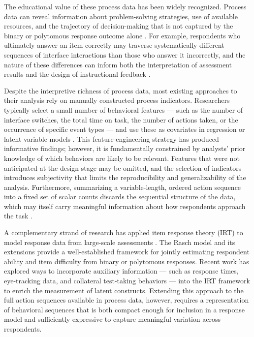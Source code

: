 \documentclass[A4paper,11pt]{article}
\begin{document}
The educational value of these process data has been widely recognized. Process data can reveal information about problem-solving strategies, use of available resources, and the trajectory of decision-making that is not captured by the binary or polytomous response outcome alone \citep{stadler2020first, eichmann2020exploring, he2021leveraging, reis2021improving, hahnel2023patterns}. For example, respondents who ultimately answer an item correctly may traverse systematically different sequences of interface interactions than those who answer it incorrectly, and the nature of these differences can inform both the interpretation of assessment results and the design of instructional feedback \citep{he2015identifying, he2016analyzing, tang2020latent, tang2021exploratory, xiao2021exploring, zhang2024external}.

Despite the interpretive richness of process data, most existing approaches to their analysis rely on manually constructed process indicators. Researchers typically select a small number of behavioral features --- such as the number of interface switches, the total time on task, the number of actions taken, or the occurrence of specific event types --- and use these as covariates in regression or latent variable models \citep{he2015identifying, he2016analyzing, goldhammer2020analysing}. This feature-engineering strategy has produced informative findings; however, it is fundamentally constrained by analysts' prior knowledge of which behaviors are likely to be relevant. Features that were not anticipated at the design stage may be omitted, and the selection of indicators introduces subjectivity that limits the reproducibility and generalizability of the analysis. Furthermore, summarizing a variable-length, ordered action sequence into a fixed set of scalar counts discards the sequential structure of the data, which may itself carry meaningful information about how respondents approach the task \citep{he2019clustering, tang2020latent, tang2021exploratory, wang2023subtask, ulitzsch2023machine, zhou2024investigating}.

A complementary strand of research has applied item response theory (IRT) to model response data from large-scale assessments \citep{rasch1960probabilistic, lord1980applications, vanderLinden2016handbook}. The Rasch model and its extensions provide a well-established framework for jointly estimating respondent ability and item difficulty from binary or polytomous responses. Recent work has explored ways to incorporate auxiliary information --- such as response times, eye-tracking data, and collateral test-taking behaviors --- into the IRT framework to enrich the measurement of latent constructs. Extending this approach to the full action sequences available in process data, however, requires a representation of behavioral sequences that is both compact enough for inclusion in a response model and sufficiently expressive to capture meaningful variation across respondents.
\end{document}
